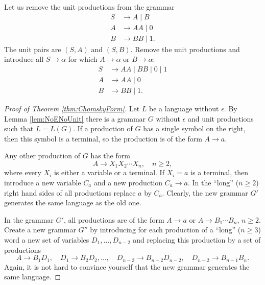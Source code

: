 \begin{page}
\setcounter{section}{5}
\setcounter{subsection}{2}
\setcounter{dfn}{10}
\label{portion:1238}

\begin{exl}
Let us remove the unit productions from the grammar
\begin{align*}
S &\to A \mid B\\
A &\to AA \mid 0\\
B &\to BB \mid 1.
\end{align*}
The unit pairs are $(S,A)$ and $(S,B)$.
Remove the unit productions and introduce all $S \to \alpha$ for which $A \to \alpha$ or $B \to \alpha$:
\begin{align*}
S &\to AA \mid BB \mid 0 \mid 1\\
A &\to AA \mid 0\\
B &\to BB \mid 1.
\end{align*}
\end{exl}

\end{page}

\begin{page}
\setcounter{section}{5}
\setcounter{subsection}{2}
\setcounter{dfn}{10}
\label{portion:1239}




\begin{proof}[Proof of Theorem \ref{thm:ChomskyForm}]
Let $L$ be a language without $\epsilon$.
By Lemma \ref{lem:NoENoUnit} there is a grammar $G$ without $\epsilon$ and unit productions such that $L = L(G)$.
If a production of $G$ has a single symbol on the right, then this symbol is a terminal, so the production is of the form $A \to a$.

Any other production of $G$ has the form
\[
A \to X_1 X_2 \cdots X_n, \quad n \ge 2,
\]
where every $X_i$ is either a variable or a terminal.
If $X_i = a$ is a terminal, then introduce a new variable $C_a$ and a new production $C_a \to a$.
In the ``long'' ($n \ge 2$) right hand sides of all productions replace $a$ by $C_a$.
Clearly, the new grammar $G'$ generates the same language as the old one.

In the grammar $G'$, all productions are of the form $A \to a$ or $A \to B_1 \cdots B_n$, $n \ge 2$.
Create a new grammar $G''$ by introducing for each production of a ``long'' ($n \ge 3$) word a new set of variables $D_1, \ldots, D_{n-2}$
and replacing this production by a set of productions
\[
A \to B_1D_1, \quad D_1 \to B_2D_2, \ldots, \quad D_{n-3} \to B_{n-2}D_{n-2}, \quad D_{n-2} \to B_{n-1}B_n.
\]
Again, it is not hard to convince yourself that the new grammar generates the same language.
\end{proof}


\end{page}

